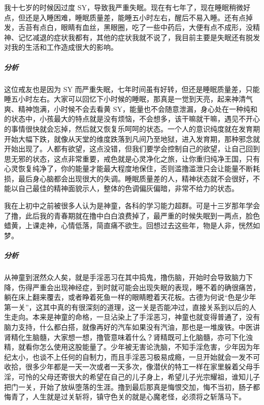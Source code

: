\begin{case}
    我十七岁的时候因过度 SY，导致我严重失眠。现在有七年了，现在睡眠稍微好点，但还是入睡困难，睡眠质量差，能睡五小时左右，醒后不易入睡。还有点掉发，舌苔有点白，眼睛有血丝，黑眼圈，吃了一些中药后，大便有点不成形，没精神、记忆减退的症状我都有，其他的症状我就不说了，我目前主要是失眠还有脱发对我的生活和工作造成很大的影响。
    \subparagraph{分析} 这位戒友也是因为 SY 而严重失眠，七年时间虽有好转，但还是睡眠质量差，只能睡五小时左右。大家可以回忆下小时候的睡眠，那真是一觉到天亮，起来神清气爽、精神饱满，小时候不会去看黄 SY，能量也不会随意泄漏，身心处在一种纯和的状态中，小孩最大的特点就是没有烦恼，不会想多，该干嘛就干嘛，遇见不开心的事情很快就会忘掉，然后就又恢复乐呵呵的状态。一个人的意识纯度就在发育期开始大幅下跌，就像从天堂的维度跌落到凡间乃至地狱，进入发育期，那种邪念就开始出现了。人都有欲望，这点没错，但我们要学会控制自己的欲望，让自己回到思无邪的状态，这点非常重要，戒色就是心灵净化之旅，让你重归纯净王国，只有心灵恢复纯净了，你的能量才能最大程度地保住，否则滥撸滥泄只会让能量不断耗损，最后身心脑都会出现很大的失调。睡眠质量差的人，精神状态就不会很好，不能以自己最佳的精神面貌示人，整体的色调偏灰偏暗，非常不给力的状态。
\end{case}

\begin{case}
    我在上初中之前被很多人认为是神童，各科的学习能力超群。可是十三岁那年学会了撸，此后我的青春期就在撸中白白浪费掉了，最严重的时候失眠到一两点，脸色蜡黄，上课走神，心情低落，简直痛不欲生。回想过去这些年，物是人非，恍然如梦。
    \subparagraph{分析} 从神童到泯然众人矣，就是手淫恶习在其中捣鬼，撸伤脑，开始时会导致脑力下降，伤得严重会出现神经症，到时就可能会出现失眠的表现，睡不着的确很痛苦，躺在床上翻来覆去，或者睁着死鱼一样的眼睛瞪着天花板。古德为何说“色是少年第一关”，这其中真的有很深刻的道理，这一关是否能冲过，直接关系到以后的人生走向。本来是神童的命格，一旦沾染上了手淫恶习，神童也就变得普通了，没有脑力支持，什么都白搭，就像再好的汽车如果没有汽油，那也是一堆废铁。中医讲肾精化生脑髓，大家想一想，撸管意味着什么？肾精既可上化脑髓，亦可下化浊精，就看你怎么使用这股能量了。少年被无害论洗脑，不知手淫危害，少年因为年纪太小，也谈不上任何的自制力，而且手淫恶习极易成瘾，一旦开始就会一发不可收拾，很多少年都是一天一次或者一天多次，像潜伏的特工一样在家里躲着父母手淫，可怜的父母还寄很大的希望在自己的儿子身上，希望儿子光宗耀祖，谁知儿子把门一关，开始了放纵堕落的生涯。撸到最后那真是悔恨交加，悔不当初，肠子都悔青了，人生就是过关斩将，镇守色关的就是心魔老怪，必须将之斩落马下。
\end{case}

